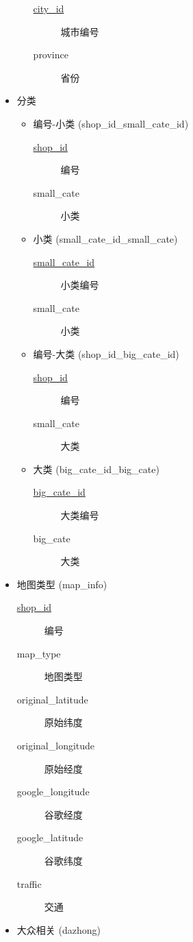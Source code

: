 \documentclass[11pt]{article}
\begin{document}
\begin{itemize}
\begin{itemize}
\begin{description}
\item[{\uline{city\_id}}] 城市编号
\item[{province}] 省份
\end{description}
\end{itemize}
\item 分类
\begin{itemize}
\item 编号-小类 (shop\_id\_small\_cate\_id)
\begin{description}
\item[{\uline{shop\_id}}] 编号
\item[{small\_cate}] 小类
\end{description}
\item 小类 (small\_cate\_id\_small\_cate)
\begin{description}
\item[{\uline{small\_cate\_id}}] 小类编号
\item[{small\_cate}] 小类
\end{description}
\item 编号-大类 (shop\_id\_big\_cate\_id)
\begin{description}
\item[{\uline{shop\_id}}] 编号
\item[{small\_cate}] 大类
\end{description}
\item 大类 (big\_cate\_id\_big\_cate)
\begin{description}
\item[{\uline{big\_cate\_id}}] 大类编号
\item[{big\_cate}] 大类
\end{description}
\end{itemize}
\item 地图类型 (map\_info)
\begin{description}
\item[{\uline{shop\_id}}] 编号
\item[{map\_type}] 地图类型
\item[{original\_latitude}] 原始纬度
\item[{original\_longitude}] 原始经度
\item[{google\_longitude}] 谷歌经度
\item[{google\_latitude}] 谷歌纬度
\item[{traffic}] 交通
\end{description}
\item 大众相关 (dazhong)
\begin{description}

\end{description}
\end{itemize}
\end{document}
